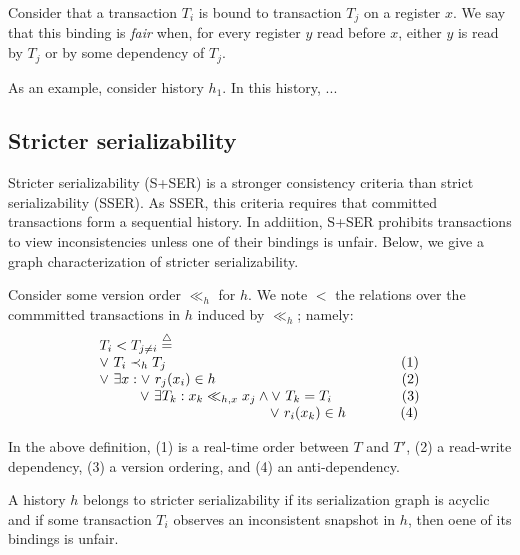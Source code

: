 \begin{definition}
  Consider that a transaction $T_i$ is bound to transaction $T_j$ on a register $x$.
  We say that this binding is \emph{fair} when, for every register $y$ read before $x$, either $y$ is read by $T_j$ or by some dependency of $T_j$.
\end{definition}

As an example, consider history $h_1$.
In this history, ...

\subsection{Stricter serializability}

Stricter serializability (S+SER) is a stronger consistency criteria than strict serializability (SSER).
As SSER, this criteria requires that committed transactions form a sequential history.
In addiition, S+SER prohibits transactions to view inconsistencies unless one of their bindings is unfair.
Below, we give a graph characterization of stricter serializability.

\begin{definition}
  Consider some version order $\ll_h$ for $h$.
  We note $<$ the relations over the commmitted transactions in $h$ induced by $\ll_h$; namely:
  \begin{displaymath}
    \begin{array}{l}
      T_i < T_{j \neq i}  \equaldef \\
      \lor~ T_i \hb_h T_j {\hspace{16.8em}\text{(1)}} \\
      \lor~ \exists x : \lor~ r_j(x_i) \in h {\hspace{13.3em}\text{(2)}} \\
      \hspace{2.9em}\lor~ \exists T_k : x_k \ll_{h,x} x_j \land \lor~T_k = T_i {\hspace{5em}\text{(3)}} \\
      \hspace{12.2em} \lor~ r_i(x_k) \in h {\hspace{3.9em}\text{(4)}}
    \end{array}
  \end{displaymath}
\end{definition}

In the above definition, (1) is a real-time order between $T$ and $T'$, (2) a read-write dependency, (3) a version ordering, and (4) an anti-dependency.

\begin{definition}
  A history $h$ belongs to stricter serializability if its serialization graph is acyclic and if some transaction $T_i$ observes an inconsistent snapshot in $h$, then oene of its bindings is unfair.
\end{definition}

